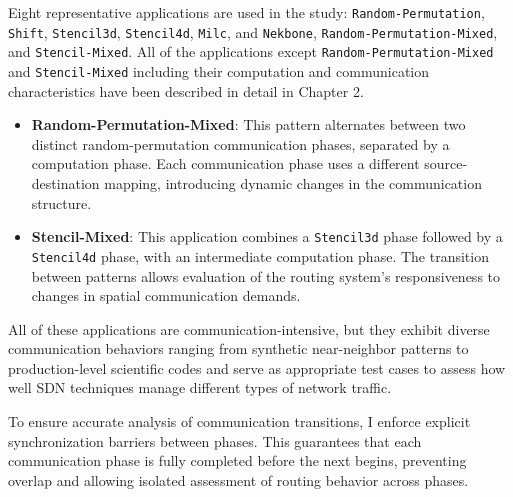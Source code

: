 Eight representative applications are used in the study:
\texttt{Random-Permutation}, \texttt{Shift}, \texttt{Stencil3d}, \texttt{Stencil4d}, \texttt{Milc}, and \texttt{Nekbone}, \texttt{Random-Permutation-Mixed},
and \texttt{Stencil-Mixed}. All of the applications except \texttt{Random-Permutation-Mixed} and \texttt{Stencil-Mixed} including 
their computation and communication characteristics have been described
in detail in Chapter 2.

\begin{itemize}
\item \textbf{Random-Permutation-Mixed}: This pattern alternates between two distinct random-permutation communication phases, separated by a computation phase. Each communication phase uses a different source-destination mapping, introducing dynamic changes in the communication structure.

\item \textbf{Stencil-Mixed}: This application combines a \texttt{Stencil3d} phase followed by a \texttt{Stencil4d} phase, with an intermediate computation phase. The transition between patterns allows evaluation of the routing system’s responsiveness to changes in spatial communication demands.
\end{itemize}

All of these applications are communication-intensive, but 
they exhibit diverse communication behaviors ranging from synthetic
near-neighbor patterns to production-level scientific codes
and serve as appropriate test cases to assess how well SDN techniques
manage different types of network traffic.

To ensure accurate analysis of communication transitions, I enforce
explicit synchronization barriers between phases. This guarantees
that each communication phase is fully completed before the next begins,
preventing overlap and allowing isolated assessment of routing behavior across phases.
